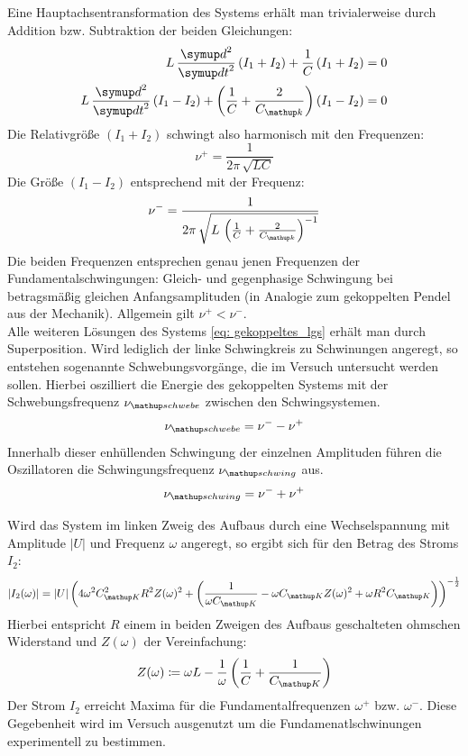 Eine Hauptachsentransformation des Systems erhält man trivialerweise durch Addition bzw.
Subtraktion der beiden Gleichungen:
\begin{align}
\begin{aligned}
  L\,\frac{\dif{}^2}{\dif{t}^2} \left( I_1 + I_2 \right) + \frac{1}{C} \left( I_1 + I_2 \right) &= 0 \\
  L\,\frac{\dif{}^2}{\dif{t}^2} \left( I_1 - I_2 \right) + \left(\frac{1}{C} + \frac{2}{C\ua{k}}\right) \left( I_1 - I_2 \right) &= 0 \\
  \label{eq: gekoppeltes_lgs}
\end{aligned}
\end{align}
Die Relativgröße $\left( I_1 + I_2 \right)$ schwingt also harmonisch mit den Frequenzen:
\begin{equation}
  \nu^+ = \frac{1}{2\pi \, \sqrt{LC}}
\end{equation}
Die Größe $\left( I_1 - I_2 \right)$ entsprechend mit der Frequenz:
\begin{equation}
\nu^- = \frac{1}{2\pi \, \sqrt{L\, \left(\frac{1}{C} + \frac{2}{C\ua{k}}\right)^{-1}}}
\end{equation}
Die beiden Frequenzen entsprechen genau jenen Frequenzen der Fundamentalschwingungen: Gleich- und gegenphasige Schwingung bei
betragsmäßig gleichen Anfangsamplituden (in Analogie zum gekoppelten Pendel aus der Mechanik). Allgemein gilt $\nu^+ < \nu^-$.\\
Alle weiteren Lösungen des Systems \eqref{eq: gekoppeltes_lgs} erhält man durch Superposition. Wird lediglich der linke Schwingkreis zu Schwinungen
angeregt, so entstehen sogenannte Schwebungsvorgänge, die im Versuch untersucht werden sollen. Hierbei oszilliert die Energie des gekoppelten Systems
mit der Schwebungsfrequenz $\nu\ua{schwebe}$ zwischen den Schwingsystemen.
\begin{equation}
  \nu\ua{schwebe} = \nu^- - \nu^+
\end{equation}
Innerhalb dieser enhüllenden Schwingung der einzelnen Amplituden führen die Oszillatoren die Schwingungsfrequenz $\nu\ua{schwing}$ aus.
\begin{equation}
  \nu\ua{schwing} = \nu^- + \nu^+
\end{equation}\par
Wird das System im linken Zweig des Aufbaus durch eine Wechselspannung mit Amplitude $\left| U \right|$ und Frequenz $\omega$ angeregt, so ergibt sich für den Betrag des
Stroms $I_2$:
\begin{equation}
|I_2(\omega)| = |U| \left( 4 \omega^2 C\ua{K}^2 R^2 Z(\omega )^2 + \left(\frac{1}{\omega C\ua{K}} - \omega C\ua{K} Z(\omega )^2 + \omega R^2 C\ua{K}\right)\right)^{-\frac{1}{2}}
\end{equation}
Hierbei entspricht $R$ einem in beiden Zweigen des Aufbaus geschalteten ohmschen Widerstand und $Z(\omega)$ der Vereinfachung:
\begin{equation}
  Z(\omega ) \coloneqq \omega L - \frac{1}{\omega } \left(\frac{1}{C} + \frac{1}{C\ua{K}}\right)
\end{equation}
Der Strom $I_2$ erreicht Maxima für die Fundamentalfrequenzen $\omega^+$ bzw. $\omega^-$. Diese Gegebenheit wird im Versuch ausgenutzt um
die Fundamenatlschwinungen experimentell zu bestimmen.
